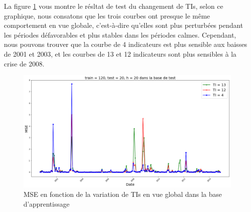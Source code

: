 La figure \ref{fig:TI} vous montre le résltat de test du changement de TIs, selon ce graphique, nous consatons que les trois courbes ont presque le même comportement en vue globale, c'est-à-dire qu'elles sont plus perturbées pendant les périodes défavorables et plus stables dans les périodes calmes. Cependant, nous pouvons trouver que la courbe de 4 indicateurs est plus sensible aux baisses de 2001 et 2003, et les courbes de 13 et 12 indicateurs sont plus sensibles à la crise de 2008. 

\begin{figure}[H]
	\centering
	\includegraphics[width=.9\linewidth, scale=0.2]
	{plot/MSE_120_20_20_N_test.png}
	\caption{MSE en fonction de la variation de TIs en vue global dans la base d'apprentissage}
	\label{fig:TI}
\end{figure}



